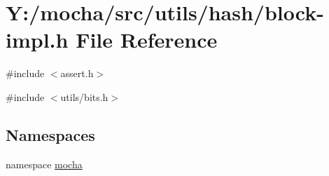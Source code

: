 \hypertarget{block-impl_8h}{
\section{Y:/mocha/src/utils/hash/block-\/impl.h File Reference}
\label{block-impl_8h}
}
{\ttfamily \#include $<$assert.h$>$}\par
{\ttfamily \#include $<$utils/bits.h$>$}\par
\subsection*{Namespaces}
\begin{DoxyCompactItemize}
\item 
namespace \hyperlink{namespacemocha}{mocha}
\end{DoxyCompactItemize}
